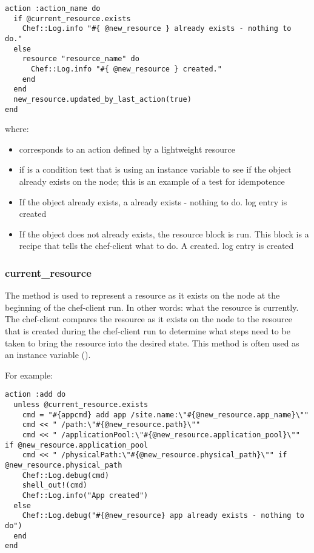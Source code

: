 \begin{lstlisting}[label=lst:cookbook-lwrp-dsl-action]
action :action_name do
  if @current_resource.exists
    Chef::Log.info "#{ @new_resource } already exists - nothing to do."
  else
    resource "resource_name" do
      Chef::Log.info "#{ @new_resource } created."
    end
  end
  new_resource.updated_by_last_action(true)
end
\end{lstlisting}

where:

\begin{itemize}
  \item {} corresponds to an action defined by a lightweight resource
  \item if  is a condition test that is using an instance variable to see if the object already exists on the node; this is an example of a test for idempotence
  \item If the object already exists, a  already exists - nothing to do. log entry is created
  \item If the object does not already exists, the resource block is run. This block is a recipe that tells the chef-client what to do. A  created. log entry is created
\end{itemize}

\subsubsection{current\_resource}

The  method is used to represent a resource as it exists on the node at the beginning of the chef-client run. In other words: what the resource is currently. The chef-client compares the resource as it exists on the node to the resource that is created during the chef-client run to determine what steps need to be taken to bring the resource into the desired state. This method is often used as an instance variable ().

For example:

\begin{lstlisting}[label=lst:cookbook-lwrp-dsl-current-resource]
action :add do
  unless @current_resource.exists
    cmd = "#{appcmd} add app /site.name:\"#{@new_resource.app_name}\""
    cmd << " /path:\"#{@new_resource.path}\""
    cmd << " /applicationPool:\"#{@new_resource.application_pool}\"" if @new_resource.application_pool
    cmd << " /physicalPath:\"#{@new_resource.physical_path}\"" if @new_resource.physical_path
    Chef::Log.debug(cmd)
    shell_out!(cmd)
    Chef::Log.info("App created")
  else
    Chef::Log.debug("#{@new_resource} app already exists - nothing to do")
  end
end
\end{lstlisting}

